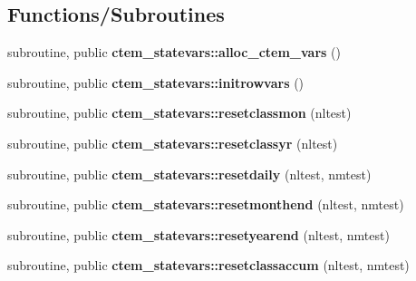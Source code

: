 \subsection*{Functions/\+Subroutines}
\begin{DoxyCompactItemize}
\item 
\hypertarget{namespacectem__statevars_ad342e3a360b7b12a40b1c80a251d95b9}{}subroutine, public {\bfseries ctem\+\_\+statevars\+::alloc\+\_\+ctem\+\_\+vars} ()\label{namespacectem__statevars_ad342e3a360b7b12a40b1c80a251d95b9}

\item 
\hypertarget{namespacectem__statevars_a069aa6fb4b132ef4fe61febb61d40ec1}{}subroutine, public {\bfseries ctem\+\_\+statevars\+::initrowvars} ()\label{namespacectem__statevars_a069aa6fb4b132ef4fe61febb61d40ec1}

\item 
\hypertarget{namespacectem__statevars_ae0b072c8e351526245a583646e778fe6}{}subroutine, public {\bfseries ctem\+\_\+statevars\+::resetclassmon} (nltest)\label{namespacectem__statevars_ae0b072c8e351526245a583646e778fe6}

\item 
\hypertarget{namespacectem__statevars_aeba858367dfd67125a0f77f94496d163}{}subroutine, public {\bfseries ctem\+\_\+statevars\+::resetclassyr} (nltest)\label{namespacectem__statevars_aeba858367dfd67125a0f77f94496d163}

\item 
\hypertarget{namespacectem__statevars_af1d0ff0bbf816233f2b51362f1ccb523}{}subroutine, public {\bfseries ctem\+\_\+statevars\+::resetdaily} (nltest, nmtest)\label{namespacectem__statevars_af1d0ff0bbf816233f2b51362f1ccb523}

\item 
\hypertarget{namespacectem__statevars_afcc1311f7dd0743cf4002b0d2635e824}{}subroutine, public {\bfseries ctem\+\_\+statevars\+::resetmonthend} (nltest, nmtest)\label{namespacectem__statevars_afcc1311f7dd0743cf4002b0d2635e824}

\item 
\hypertarget{namespacectem__statevars_a090f13e5df0ad3551010689fcf82a0ac}{}subroutine, public {\bfseries ctem\+\_\+statevars\+::resetyearend} (nltest, nmtest)\label{namespacectem__statevars_a090f13e5df0ad3551010689fcf82a0ac}

\item 
\hypertarget{namespacectem__statevars_ac5b2a6004c5c8f833b1ec04ef0d8674f}{}subroutine, public {\bfseries ctem\+\_\+statevars\+::resetclassaccum} (nltest, nmtest)\label{namespacectem__statevars_ac5b2a6004c5c8f833b1ec04ef0d8674f}


\end{DoxyCompactItemize}
